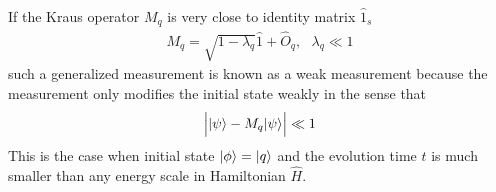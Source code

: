 If the Kraus operator $M_q$ is very close to identity matrix $\hat 1_s$
\begin{align}
    M_q=\sqrt{1-\lambda_q}\hat1+\hat O_q,~~~\lambda_q\ll1
\end{align}
such a generalized measurement is known as a weak measurement because the measurement only modifies the initial state weakly in the sense that 
\begin{align}
    \Big||{\psi}\rangle-{M_q|{\psi}\rangle}\Big|\ll1
\end{align}
This is the case when initial state $|{\phi}\rangle=|{q}\rangle$ and the evolution time $t$ is much smaller than any energy scale in Hamiltonian $\hat H$. 